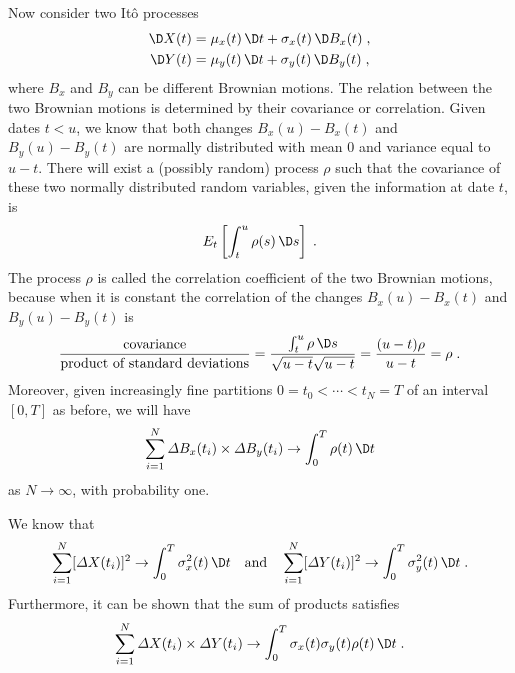 Now consider two It\^o processes
\begin{subequations}
\begin{align}
\D X(t) &= \mu_x(t)\,\D t + \sigma_x(t)\,\D B_x(t)\;,\label{itoprocess110}\\
\D Y(t) &= \mu_y(t)\,\D t + \sigma_y(t)\,\D B_y(t)\;,\label{itoprocess111}
\end{align}
\end{subequations}
where $B_x$ and $B_y$ can be different Brownian motions.  The relation between the two Brownian motions is determined by their covariance or correlation.  Given dates $t<u$, we know that both changes $B_x(u)-B_x(t)$ and $B_y(u)-B_y(t)$ are normally distributed with mean 0 and variance equal to $u-t$.  There will exist a (possibly random) process $\rho$ such that the covariance  of these two normally distributed random variables, given the information at date $t$, is 
$$E_t \left[\int_t^u \rho(s)\,\D s\right]\; .$$
The process $\rho$ is called the correlation coefficient of the two Brownian motions,  because when it is constant the correlation of the changes $B_x(u)-B_x(t)$ and $B_y(u)-B_y(t)$ is
$$\frac{\text{covariance}}{\text{product of standard deviations}}  = \frac{\int_t^u \rho \,\D s}{\sqrt{u-t} \sqrt{u-t}} = \frac{(u-t)\rho}{u-t} = \rho\; .$$
Moreover, given increasingly fine partitions $0=t_0 < \cdots < t_N=T$ of an interval $[0,T]$ as before, we will have
$$\sum_{i=1}^N \varDelta B_x(t_i) \times \varDelta B_y(t_i) \rightarrow \int_0^T \rho(t)\,\D t$$
as $N \rightarrow \infty$, with probability one.  

We know that
\begin{equation}\label{itoprocess112}\sum _{i=1}^N [\varDelta X(t_i)]^2 \rightarrow \int_0^T \sigma_x^2(t)\,\D t \quad \text{and}\quad  \sum _{i=1}^N [\varDelta Y(t_i)]^2 \rightarrow \int_0^T\sigma_y^2(t)\,\D t\;.
\end{equation}
Furthermore, it can be shown that the sum of products satisfies
\begin{equation}\label{itoprocess113}
\sum_{i=1}^N \varDelta X(t_i) \times \varDelta Y(t_i) \rightarrow \int_0^T \sigma_x(t)\sigma_y(t)\rho(t)\,\D t\;.
\end{equation}


